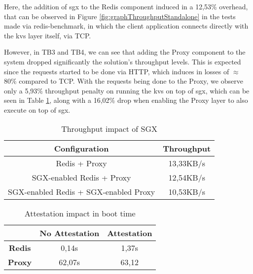 Here, the addition of \gls{sgx} to the Redis component induced in a 12,53\% overhead, that can be observed in Figure \ref{fig:graphThroughputStandalone} in the tests made via redis-benchmark, in which the client application connects directly with the \gls{kvs} layer itself, via TCP. 

However, in TB3 and TB4, we can see that adding the Proxy component to the system dropped significantly the solution's throughput levels. This is expected since the requests started to be done via HTTP, which induces in losses of $\approx$80\% compared to TCP. With the requests being done to the Proxy, we observe only a 5,93\% throughput penalty on running the \gls{kvs} on top of \gls{sgx}, which can be seen in Table \ref{table:throughputSingleRedis}, along with a 16,02\% drop when enabling the Proxy layer to also execute on top of \gls{sgx}.


\begin{table}[ht]
	\caption{Throughput impact of SGX} %
	\centering %
	\begin{tabular}{c c} %
		\hline\hline %
		\textbf{Configuration} & \textbf{Throughput} \\ [0.5ex] %
		\hline
		Redis + Proxy & 13,33KB/s\\
		\hline
		SGX-enabled Redis + Proxy & 12,54KB/s \\
		\hline %
		SGX-enabled Redis + SGX-enabled Proxy & 10,53KB/s\\ [1ex] %
		\hline %
	\end{tabular}
	\label{table:throughputSingleRedis} %
\end{table}

\begin{table}[ht]
	\caption{Attestation impact in boot time} %
	\centering %
	\begin{tabular}{c c c} %
		\hline\hline %
		\textbf{} & \textbf{No Attestation} & \textbf{Attestation} \\ [0.5ex] %
		\hline
		\textbf{Redis} & 0,14s & 1,37s\\
		\hline %
		\textbf{Proxy} & 62,07s & 63,12\\ [1ex] %
		\hline %
	\end{tabular}
	\label{table:attestationImpactBoot} %
\end{table}

